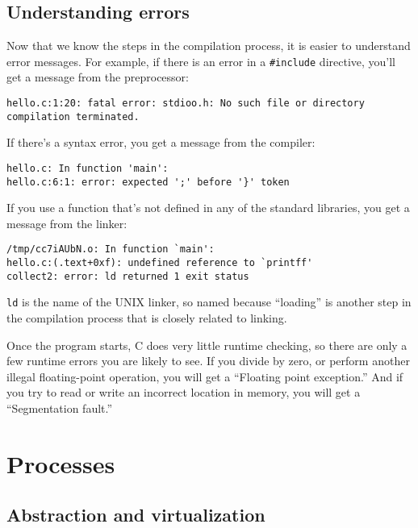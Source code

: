 \documentclass[12pt]{book}
\begin{document}
\section{Understanding errors}

Now that we know the steps in the compilation process, it is easier
to understand error messages.  For example, if there is an error
in a \verb"#include" directive, you'll get a message from the
preprocessor:

\begin{verbatim}
hello.c:1:20: fatal error: stdioo.h: No such file or directory
compilation terminated.
\end{verbatim}

If there's a syntax error, you get a message from the compiler:

\begin{verbatim}
hello.c: In function 'main':
hello.c:6:1: error: expected ';' before '}' token
\end{verbatim}

If you use a function that's not defined in any of the standard
libraries, you get a message from the linker:

\begin{verbatim}
/tmp/cc7iAUbN.o: In function `main':
hello.c:(.text+0xf): undefined reference to `printff'
collect2: error: ld returned 1 exit status
\end{verbatim}

{\tt ld} is the name of the UNIX linker, so named because ``loading''
is another step in the compilation process that is closely related
to linking.

Once the program starts, C does very little runtime checking,
so there are only a few runtime errors you are likely to see.  If you
divide by zero, or perform another illegal floating-point operation, you
will get a ``Floating point exception.''  And if you try to read or
write an incorrect location in memory, you will get a ``Segmentation
fault.''



\chapter{Processes}

\section{Abstraction and virtualization}
\end{document}
